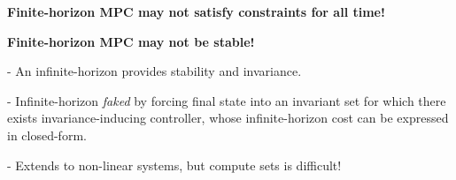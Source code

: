 

\begin{sstFrame}[ForestGreen!20]

	\textbf{Finite-horizon MPC may not satisfy constraints for all time!}

	\textbf{Finite-horizon MPC may not be stable!}

	-	An infinite-horizon provides stability and invariance.

	-	Infinite-horizon \textit{faked} by forcing final state
	into an invariant set for which there exists
	invariance-inducing controller,
	whose infinite-horizon cost can be expressed in closed-form.

	-	Extends to non-linear systems, but compute sets is difficult!
\end{sstFrame}

